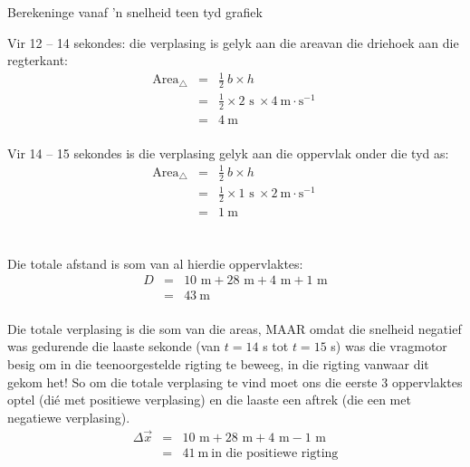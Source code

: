\begin{wex}{Berekeninge vanaf 'n snelheid teen tyd grafiek}
{\begin{minipage}{0.4\textwidth}
Vir 12 -- 14 sekondes: die verplasing is gelyk aan die areavan die driehoek aan die regterkant:
\begin{eqnarray*}
\text{Area}_{\triangle} &=& \frac{1}{2}~b \times h\\
&=& \frac{1}{2} \times 2\text{~s}\ \times 4 ~\text{m}\cdot \text{s}^{-1} \ \\
&=&4\ \text{m}\\
\end{eqnarray*}
\end{minipage}
\begin{minipage}{0.05\textwidth}
\begin{center}
\end{center}
\end{minipage}
\begin{minipage}{0.4\textwidth}
Vir 14 -- 15 sekondes is die verplasing gelyk aan die oppervlak onder die tyd as:
\begin{eqnarray*}
\text{Area}_{\triangle} &=& \frac{1}{2}~b \times h\\
&=& \frac{1}{2} \times 1\text{~s}\ \times 2 ~\text{m}\cdot \text{s}^{-1}\ \\
&=&1\ \text{m}\\
\end{eqnarray*}
\end{minipage}
\\
Die totale afstand is som van al hierdie oppervlaktes:
\begin{eqnarray*}
D&=&10\text{~m} + 28\text{~m} + 4\text{~m} + 1\text{~m}\\
&=&43\ \text{m}
\end{eqnarray*}
\\
Die totale verplasing is die som van die areas, MAAR omdat die snelheid negatief was gedurende die laaste sekonde (van $t=14$ s tot $t=15$ s) was die vragmotor besig om in die teenoorgestelde rigting te beweeg, in die rigting vanwaar dit gekom het! So om die totale verplasing te vind moet ons die eerste 3 oppervlaktes optel (di\'e met positiewe verplasing) en die laaste een aftrek (die een met negatiewe verplasing).
\begin{eqnarray*}
\Delta \vec{x}&=&10\text{~m} +28\text{~m} +4\text{~m} -1\text{~m}\\
&=&41\ \text{m}\ \mbox{in die positiewe rigting}
\end{eqnarray*}
}
\end{wex}

